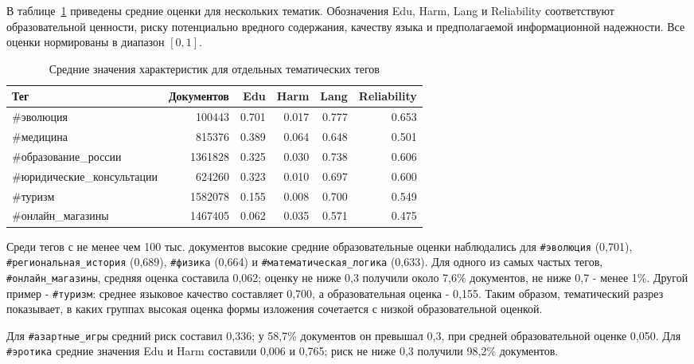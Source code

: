 \documentclass[12pt,a4paper]{article}
\begin{document}
В таблице~\ref{tab:feature-values-by-tags} приведены средние оценки для нескольких тематик.
Обозначения Edu, Harm, Lang и Reliability соответствуют образовательной ценности,
риску потенциально вредного содержания, качеству языка и предполагаемой информационной надежности.
Все оценки нормированы в диапазон $[0,1]$.

\begin{table}[ht]
\centering
\small
\caption{Средние значения характеристик для отдельных тематических тегов}
\label{tab:feature-values-by-tags}
\begin{tabular}{lrrrrr}
\toprule
Тег & Документов & Edu & Harm & Lang & Reliability \\
\midrule
\#эволюция &
100443 & 0.701 & 0.017 & 0.777 & 0.653 \\

\#медицина &
815376 & 0.389 & 0.064 & 0.648 & 0.501 \\

\#образование\_россии &
1361828 & 0.325 & 0.030 & 0.738 & 0.606 \\

\#юридические\_консультации &
624260 & 0.323 & 0.010 & 0.697 & 0.600 \\

\#туризм &
1582078 & 0.155 & 0.008 & 0.700 & 0.549 \\

\#онлайн\_магазины &
1467405 & 0.062 & 0.035 & 0.571 & 0.475 \\


\bottomrule
\end{tabular}
\end{table}

Среди тегов с не менее чем 100 тыс. документов высокие средние образовательные оценки
наблюдались для \texttt{\#эволюция} (0,701), \texttt{\#региональная\_история} (0,689),
\texttt{\#физика} (0,664) и \texttt{\#математическая\_логика} (0,633).
Для одного из самых частых тегов, \texttt{\#онлайн\_магазины}, средняя оценка составила 0,062;
оценку не ниже 0,3 получили около 7,6\% документов, не ниже 0,7 - менее 1\%.
Другой пример - \texttt{\#туризм}: среднее языковое качество составляет 0,700,
а образовательная оценка - 0,155. Таким образом, тематический разрез показывает,
в каких группах высокая оценка формы изложения сочетается с низкой образовательной оценкой.

Для \texttt{\#азартные\_игры} средний риск составил 0,336;
у 58,7\% документов он превышал 0,3, при средней образовательной оценке 0,050.
Для \texttt{\#эротика} средние значения Edu и Harm составили 0,006 и 0,765;
риск не ниже 0,3 получили 98,2\% документов.
\end{document}
